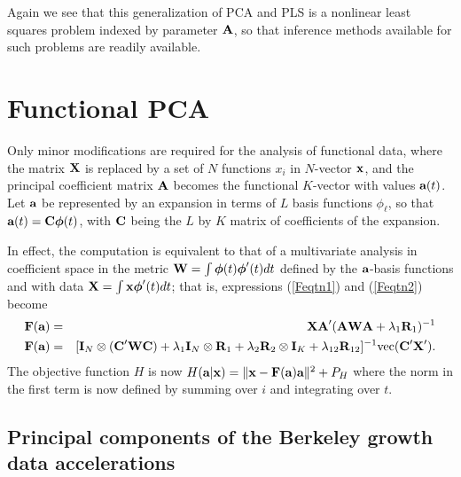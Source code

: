 \documentclass[12pt]{article}
\begin{document}
Again we see that this generalization of PCA and PLS is a nonlinear least squares problem indexed by parameter $\mbox{\bf A}$, so that inference methods available for such problems are readily available.


\section{Functional PCA}
\label{sec:fPCA}

Only minor modifications are required for the analysis of functional data, where the matrix $\mbox{\bf X}$ is replaced by a set of $N$ functions $x_i$ in $N$-vector $\mbox{\bf x}$, and the principal coefficient matrix $\mbox{\bf A}$ becomes the functional $K$-vector  with values $\mbox{\bf a}(t)$.  Let $\mbox{\bf a}$ be represented by an expansion in terms of $L$ basis functions $\phi_\ell$, so that $\mbox{\bf a}(t) = \mbox{\bf C} \mbox{\boldmath${\phi}$}(t)$, with $\mbox{\bf C}$ being the $L$ by $K$ matrix of coefficients of the expansion.  

In effect, the computation is equivalent to that of a multivariate analysis in coefficient space in the metric $\mbox{\bf W} = \int \mbox{\boldmath${\phi}$}(t) \mbox{\boldmath${\phi}$}'(t) dt$  defined by the $\mbox{\bf a}$-basis functions and with data $\mbox{\bf X} = \int \mbox{\bf x} \mbox{\boldmath${\phi}$}'(t) dt$; that is, expressions (\ref{Feqtn1}) and (\ref{Feqtn2}) become
\begin{eqnarray} \label{Feqtn3}
  \mbox{\bf F}(\mbox{\bf a}) & = & \mbox{\bf X} \mbox{\bf A}'(\mbox{\bf A} \mbox{\bf W} \mbox{\bf A} + \lambda_1 \mbox{\bf R}_1)^{-1} 
  \nonumber \\
  \mbox{\bf F}(\mbox{\bf a}) & = & [\mbox{\bf I}_N \otimes (\mbox{\bf C}' \mbox{\bf W} \mbox{\bf C}) + \lambda_1 \mbox{\bf I}_N \otimes \mbox{\bf R}_1 + \lambda_2 \mbox{\bf R}_2 \otimes \mbox{\bf I}_K + \lambda_{12} \mbox{\bf R}_{12}]^{-1} \mbox{vec}(\mbox{\bf C}' \mbox{\bf X}')  .
\end{eqnarray}
The objective function $H$ is now $H(\mbox{\bf a}|\mbox{\bf x}) = \|\mbox{\bf x} - \mbox{\bf F}(\mbox{\bf a}) \mbox{\bf a} \| ^2 + P_H$ where the norm in the first term is now defined by summing over $i$ and integrating over $t$.


\subsection{Principal components of the Berkeley growth data accelerations}
\label{subsec:GrowthAccel}
\end{document}
